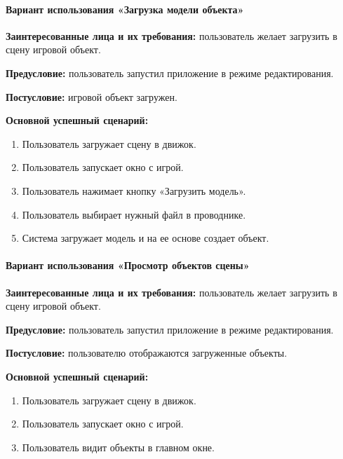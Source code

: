 \paragraph{Вариант использования «Загрузка модели объекта»}
\textbf{Заинтересованные лица и их требования:} пользователь желает загрузить в сцену игровой объект.

\textbf{Предусловие:} пользователь запустил приложение в режиме редактирования.

\textbf{Постусловие:} игровой объект загружен.

\textbf{Основной успешный сценарий:}

\begin{enumerate}
	\item Пользователь загружает сцену в движок.
	
	\item Пользователь запускает окно с игрой.
	
	\item Пользователь нажимает кнопку «Загрузить модель».
	
	\item Пользователь выбирает нужный файл в проводнике.
	
	\item Система загружает модель и на ее основе создает объект.
\end{enumerate}

\paragraph{Вариант использования «Просмотр объектов сцены»}
\textbf{Заинтересованные лица и их требования:} пользователь желает загрузить в сцену игровой объект.

\textbf{Предусловие:} пользователь запустил приложение в режиме редактирования.

\textbf{Постусловие:} пользователю отображаются загруженные объекты.

\textbf{Основной успешный сценарий:}

\begin{enumerate}
	\item Пользователь загружает сцену в движок.
	
	\item Пользователь запускает окно с игрой.
	
	\item Пользователь видит объекты в главном окне.
\end{enumerate}

